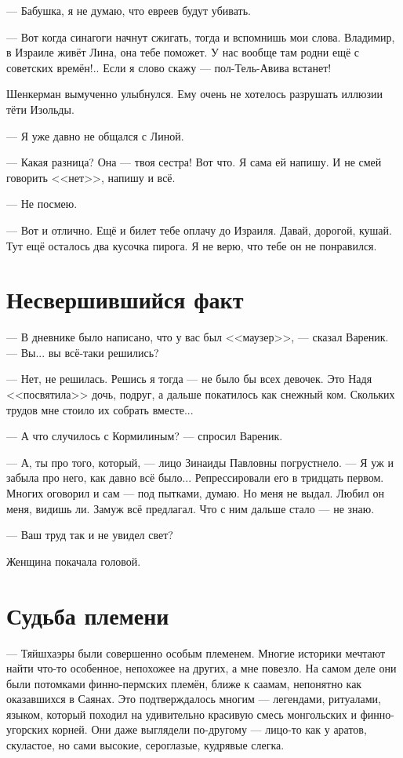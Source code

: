 \documentclass[a4paper,10pt,fleqn]{book}\usepackage{polyglossia}\setdefaultlanguage{english}\setotherlanguage{russian}\defaultfontfeatures{Ligatures=TeX,Mapping=tex-text} \usepackage{xcolor}\definecolor{lightgray}{HTML}{bbbbbb}\color{lightgray}\newcommand{\ml}[3]{\textcolor{black}{#3}}
\begin{document}
--- Бабушка, я не думаю, что евреев будут убивать.

--- Вот когда синагоги начнут сжигать, тогда и вспомнишь мои слова.
Владимир, в Израиле живёт Лина, она тебе поможет.
У нас вообще там родни ещё с советских времён!..
Если я слово скажу --- пол-Тель-Авива встанет!

Шенкерман вымученно улыбнулся.
Ему очень не хотелось разрушать иллюзии тёти Изольды.

--- Я уже давно не общался с Линой.

--- Какая разница?
Она --- твоя сестра!
Вот что.
Я сама ей напишу.
И не смей говорить <<нет>>, напишу и всё.

--- Не посмею.

--- Вот и отлично.
Ещё и билет тебе оплачу до Израиля.
Давай, дорогой, кушай.
Тут ещё осталось два кусочка пирога.
Я не верю, что тебе он не понравился.

\section{Несвершившийся факт}

--- В дневнике было написано, что у вас был <<маузер>>, --- сказал Вареник.
--- Вы... вы всё-таки решились?

--- Нет, не решилась.
Решись я тогда --- не было бы всех девочек.
Это Надя <<посвятила>> дочь, подруг, а дальше покатилось как снежный ком.
Скольких трудов мне стоило их собрать вместе...

--- А что случилось с Кормилиным? --- спросил Вареник.

--- А, ты про того, который, --- лицо Зинаиды Павловны погрустнело.
--- Я уж и забыла про него, как давно всё было...
Репрессировали его в тридцать первом.
Многих оговорил и сам --- под пытками, думаю.
Но меня не выдал.
Любил он меня, видишь ли.
Замуж всё предлагал.
Что с ним дальше стало --- не знаю.

--- Ваш труд так и не увидел свет?

Женщина покачала головой.

\section{Судьба племени}

--- Тяйшхаэры были совершенно особым племенем.
Многие историки мечтают найти что-то особенное, непохожее на других, а мне повезло.
На самом деле они были потомками финно-пермских племён, ближе к саамам, непонятно как оказавшихся в Саянах.
Это подтверждалось многим --- легендами, ритуалами, языком, который походил на удивительно красивую смесь монгольских и финно-угорских корней.
Они даже выглядели по-другому --- лицо-то как у аратов, скуластое, но сами высокие, сероглазые, кудрявые слегка.
\end{document}
